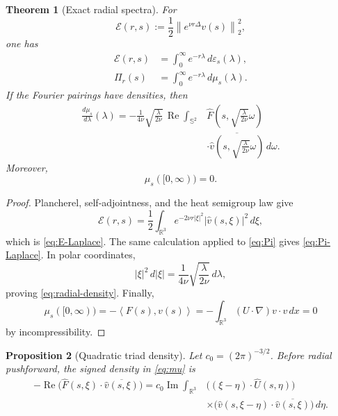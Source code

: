 \documentclass[11pt]{article}
\newtheorem{theorem}{Theorem}
\newtheorem{proposition}[theorem]{Proposition}
\theoremstyle{remark}
\newcommand{\R}{\mathbb R}
\newcommand{\norm}[1]{\left\|#1\right\|}
\newcommand{\ip}[2]{\left\langle #1,#2\right\rangle}
\begin{document}
\begin{theorem}[Exact radial spectra]
\label{thm:radial}
For
\begin{equation}
\label{eq:heat-energy}
 \mathcal E(r,s):=
 \frac12\norm{e^{\nu r\Delta}v(s)}_2^2,
\end{equation}
one has
\begin{align}
\label{eq:E-Laplace}
 \mathcal E(r,s)
 &=\int_0^\infty e^{-r\lambda}\,d\varepsilon_s(\lambda),\\
\label{eq:Pi-Laplace}
 \Pi_r(s)
 &=\int_0^\infty e^{-r\lambda}\,d\mu_s(\lambda).
\end{align}
If the Fourier pairings have densities, then
\begin{equation}
\label{eq:radial-density}
\begin{aligned}
 \frac{d\mu_s}{d\lambda}(\lambda)
 =
 -\frac1{4\nu}\sqrt{\frac{\lambda}{2\nu}}\,
 \operatorname{Re}\int_{\mathbb S^2}
 &\widehat F
 \left(s,\sqrt{\frac{\lambda}{2\nu}}\omega\right)\\
 &\cdot
 \overline{\widehat v
 \left(s,\sqrt{\frac{\lambda}{2\nu}}\omega\right)}
 \,d\omega .
\end{aligned}
\end{equation}
Moreover,
\begin{equation}
\label{eq:mass-zero}
 \mu_s([0,\infty))=0.
\end{equation}
\end{theorem}

\begin{proof}
Plancherel, self-adjointness, and the heat semigroup law give
\[
 \mathcal E(r,s)
 =
 \frac12\int_{\R^3}
 e^{-2\nu r|\xi|^2}|\widehat v(s,\xi)|^2\,d\xi,
\]
which is \eqref{eq:E-Laplace}.  The same calculation applied to
\eqref{eq:Pi} gives \eqref{eq:Pi-Laplace}.  In polar coordinates,
\[
 |\xi|^2\,d|\xi|
 =
 \frac1{4\nu}\sqrt{\frac{\lambda}{2\nu}}\,d\lambda,
\]
proving \eqref{eq:radial-density}.  Finally,
\[
 \mu_s([0,\infty))
 =-\ip{F(s)}{v(s)}
 =-\int_{\R^3}(U\cdot\nabla)v\cdot v\,dx=0
\]
by incompressibility.
\end{proof}

\begin{proposition}[Quadratic triad density]
\label{prop:triad-density}
Let \(c_0=(2\pi)^{-3/2}\).  Before radial pushforward, the signed density
in \eqref{eq:mu} is
\begin{equation}
\label{eq:triad-density}
\begin{aligned}
 -\operatorname{Re}
 \bigl(\widehat F(s,\xi)\cdot\overline{\widehat v(s,\xi)}\bigr)
 =
 c_0\operatorname{Im}\int_{\R^3}
 &\bigl((\xi-\eta)\cdot\widehat U(s,\eta)\bigr)\\
 &\times
 \bigl(\widehat v(s,\xi-\eta)\cdot
 \overline{\widehat v(s,\xi)}\bigr)\,d\eta .
\end{aligned}
\end{equation}
\end{proposition}
\end{document}
